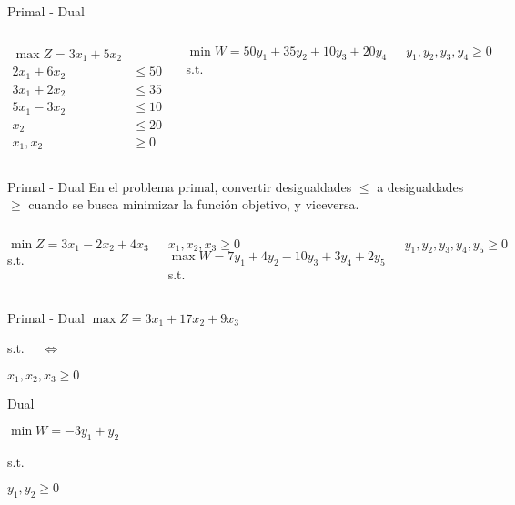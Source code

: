 \begin{frameExample}{Primal - Dual}{}
  \begin{columns}
        \begin{align*}
      \max Z = 3x_1 + 5x_2 & \\[3mm]
    2x_1 + 6x_2 & \leq 50\\
    3x_1 + 2x_2 & \leq 35\\
    5x_1 - 3x_2 & \leq 10\\
    x_2 & \leq 20\\[5mm]
    x_1, x_2 & \geq 0
        \end{align*}
        
                 \[      \min W = 50y_1 + 35y_2  + 10y_3 + 20y_4  \]
                  s.t.  %
  
  $    y_1, y_2, y_3, y_4  \geq 0$
  \end{columns}
\end{frameExample}


\begin{frameExample}{Primal - Dual}{}
En el problema primal, convertir desigualdades $\leq$ a desigualdades $\geq$ cuando se busca \alert{minimizar} la función objetivo, y viceversa.
  \begin{columns}
\[      \min Z = 3x_1 - 2x_2 + 4x_3  \]
s.t.%

          $    x_1, x_2, x_3  \geq 0$
                 \[      \max W = 7y_1 + 4y_2  - 10y_3 + 3y_4 + 2y_5  \]
                  s.t.  %
  
  $    y_1, y_2, y_3, y_4, y_5  \geq 0$
  \end{columns}
\end{frameExample}


\begin{frameExample}{Primal - Dual}{}
  $  \max Z = 3x_1+ 17x_2 + 9x_3 $
  
  s.t.
$\quad \Leftrightarrow \quad$ 

$x_1, x_2, x_3  \geq 0 $
\vspace{5mm}

\begin{block}{Dual}
  
  $\min W = -3y_1 + y_2 $

                  s.t.  %
  
  $    y_1, y_2  \geq 0 $
\end{block}
\end{frameExample}


